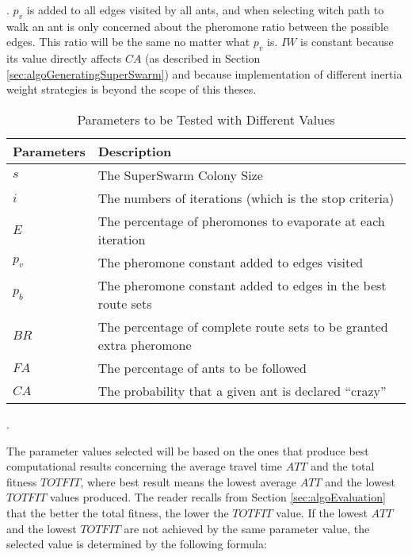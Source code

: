 . $p_v$ is added to all edges visited by all ants, and when selecting witch path to walk an ant is only concerned about the pheromone ratio between the possible edges. This ratio will be the same no matter what $p_v$ is. $IW$ is constant because its value directly affects $CA$ (as described in Section \vref{sec:algoGeneratingSuperSwarm}) and because implementation of different inertia weight strategies is beyond the scope of this theses. 

 

\begin{table}[H]
	\begin{tabular}{|l|l|}
    	\hline
    	Parameters & Description\\
    	\hline
    	$s$ & The SuperSwarm Colony Size\\
    	$i$ & The numbers of iterations (which is the stop criteria)\\
    	$E$ & The percentage of pheromones to evaporate at each iteration\\
    	$p_v$ & The pheromone constant added to edges visited\\
    	$p_b$ & The pheromone constant added to edges in the best route sets\\
    	$BR$ & The percentage of complete route sets to be granted extra pheromone\\
    	$FA$ & The percentage of ants to be followed\\
    	$CA$ & The probability that a given ant is declared ``crazy''\\
   	    \hline
    \end{tabular}
    \caption {Parameters to be Tested with Different Values}.
    \label{table:parameters}
\end{table}

The parameter values selected will be based on the ones that produce best computational results concerning the average travel time $ATT$ and the total fitness $TOTFIT$, where best result means the lowest average $ATT$ and the lowest $TOTFIT$ values produced. The reader recalls from Section \vref{sec:algoEvaluation} that the better the total fitness, the lower the $TOTFIT$ value. If the lowest $ATT$ and the lowest $TOTFIT$ are not achieved by the same parameter value, the selected value is determined by the following formula:

